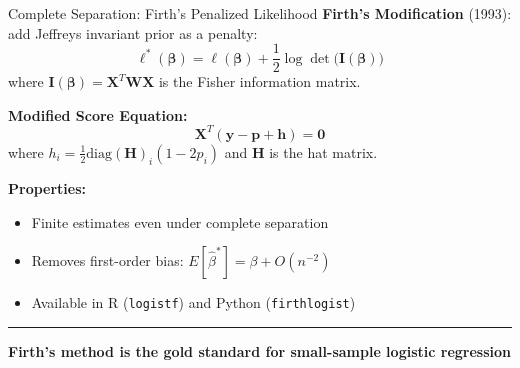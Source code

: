 \documentclass[8pt,aspectratio=169]{beamer}
\newcommand{\bottomnote}[1]{%
\vfill
\vspace{-2mm}
\textcolor{mllavender2}{\rule{\textwidth}{0.4pt}}
\vspace{1mm}
\footnotesize
\textbf{#1}
}
\begin{document}
\begin{frame}[t]{Complete Separation: Firth's Penalized Likelihood}
\textbf{Firth's Modification} (1993): add Jeffreys invariant prior as a penalty:
\begin{equation}
  \ell^*(\boldsymbol{\beta}) = \ell(\boldsymbol{\beta}) + \frac{1}{2}\log\det\bigl(\mathbf{I}(\boldsymbol{\beta})\bigr)
\end{equation}
where $\mathbf{I}(\boldsymbol{\beta}) = \mathbf{X}^T\mathbf{W}\mathbf{X}$ is the Fisher information matrix.

\vspace{0.3em}
\textbf{Modified Score Equation:}
\begin{equation}
  \mathbf{X}^T(\mathbf{y} - \mathbf{p} + \mathbf{h}) = \mathbf{0}
\end{equation}
where $h_i = \frac{1}{2}\text{diag}(\mathbf{H})_i(1 - 2p_i)$ and $\mathbf{H}$ is the hat matrix.

\vspace{0.3em}
\textbf{Properties:}
\begin{itemize}
\item Finite estimates even under complete separation
\item Removes first-order bias: $E[\hat{\beta}^*] = \beta + O(n^{-2})$
\item Available in R (\texttt{logistf}) and Python (\texttt{firthlogist})
\end{itemize}
\bottomnote{Firth's method is the gold standard for small-sample logistic regression}
\end{frame}
\end{document}
